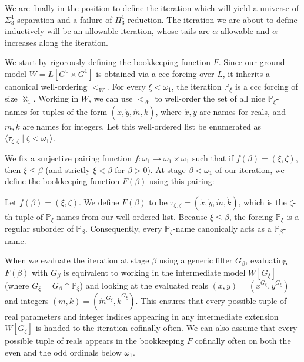 \documentclass[a4paper,11pt]{article}
\begin{document}
We are finally in the position to define the iteration which will yield a universe of $\Sigma_3^1$ separation and a failure of $\Pi_3^1$-reduction. The iteration we are about to define inductively will be an allowable iteration, whose tails are $\alpha$-allowable and $\alpha$ increases along the iteration.

We start by rigorously defining the bookkeeping function $F$. Since our ground model $W = L[G^0 \times G^1]$ is obtained via a ccc forcing over $L$, it inherits a canonical well-ordering $<_W$. For every $\xi < \omega_1$, the iteration $\mathbb{P}_{\xi}$ is a ccc forcing of size $\aleph_1$. Working in $W$, we can use $<_W$ to well-order the set of all nice $\mathbb{P}_{\xi}$-names for tuples of the form $(\dot{x}, \dot{y}, \dot{m}, \dot{k})$, where $\dot{x}, \dot{y}$ are names for reals, and $\dot{m}, \dot{k}$ are names for integers. Let this well-ordered list be enumerated as $\langle \tau_{\xi, \zeta} \mid \zeta < \omega_1 \rangle$.

We fix a surjective pairing function $f: \omega_1 \to \omega_1 \times \omega_1$ such that if $f(\beta) = (\xi, \zeta)$, then $\xi \le \beta$ (and strictly $\xi < \beta$ for $\beta > 0$). At stage $\beta < \omega_1$ of our iteration, we define the bookkeeping function $F(\beta)$ using this pairing:

Let $f(\beta) = (\xi, \zeta)$. We define $F(\beta)$ to be $\tau_{\xi, \zeta} = (\dot{x}, \dot{y}, \dot{m}, \dot{k})$, which is the $\zeta$-th tuple of $\mathbb{P}_{\xi}$-names from our well-ordered list. Because $\xi \le \beta$, the forcing $\mathbb{P}_{\xi}$ is a regular suborder of $\mathbb{P}_{\beta}$. Consequently, every $\mathbb{P}_{\xi}$-name canonically acts as a $\mathbb{P}_{\beta}$-name. 

When we evaluate the iteration at stage $\beta$ using a generic filter $G_{\beta}$, evaluating $F(\beta)$ with $G_{\beta}$ is equivalent to working in the intermediate model $W[G_{\xi}]$ (where $G_{\xi} = G_{\beta} \cap \mathbb{P}_{\xi}$) and looking at the evaluated reals $(x, y) = (\dot{x}^{G_{\xi}}, \dot{y}^{G_{\xi}})$ and integers $(m, k) = (\dot{m}^{G_{\xi}}, \dot{k}^{G_{\xi}})$. This  ensures that every possible tuple of real parameters and integer indices appearing in any intermediate extension $W[G_{\xi}]$ is handed to the iteration cofinally often. We can also  assume that every possible tuple of reals appears in the bookkeeping $F$ cofinally often on both the even and the odd ordinals below $\omega_1$.
\end{document}
